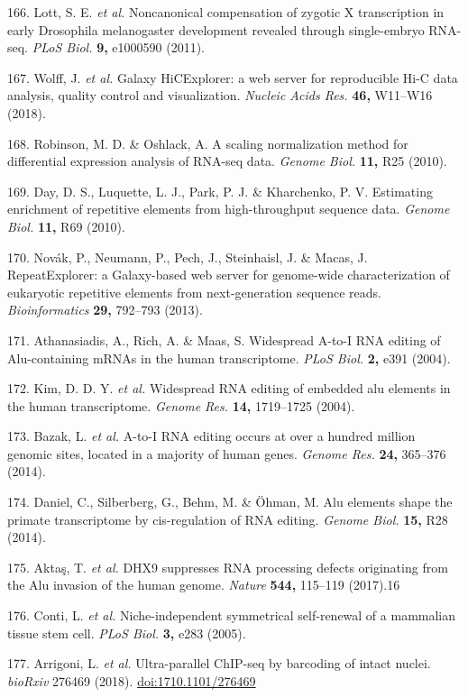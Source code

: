 \documentclass[11pt,twoside]{MPIthesis}
\theoremstyle{definition}
\theoremstyle{definition}
\theoremstyle{definition}
\theoremstyle{remark}
\begin{document}
166. Lott, S. E. \emph{et al.} Noncanonical compensation of zygotic X
transcription in early Drosophila melanogaster development revealed
through single-embryo RNA-seq. \emph{PLoS Biol.} \textbf{9,} e1000590
(2011).

167. Wolff, J. \emph{et al.} Galaxy HiCExplorer: a web server for
reproducible Hi-C data analysis, quality control and visualization.
\emph{Nucleic Acids Res.} \textbf{46,} W11--W16 (2018).

168. Robinson, M. D. \& Oshlack, A. A scaling normalization method for
differential expression analysis of RNA-seq data. \emph{Genome Biol.}
\textbf{11,} R25 (2010).

169. Day, D. S., Luquette, L. J., Park, P. J. \& Kharchenko, P. V.
Estimating enrichment of repetitive elements from high-throughput
sequence data. \emph{Genome Biol.} \textbf{11,} R69 (2010).

170. Novák, P., Neumann, P., Pech, J., Steinhaisl, J. \& Macas, J.
RepeatExplorer: a Galaxy-based web server for genome-wide
characterization of eukaryotic repetitive elements from next-generation
sequence reads. \emph{Bioinformatics} \textbf{29,} 792--793 (2013).

171. Athanasiadis, A., Rich, A. \& Maas, S. Widespread A-to-I RNA
editing of Alu-containing mRNAs in the human transcriptome. \emph{PLoS
Biol.} \textbf{2,} e391 (2004).

172. Kim, D. D. Y. \emph{et al.} Widespread RNA editing of embedded alu
elements in the human transcriptome. \emph{Genome Res.} \textbf{14,}
1719--1725 (2004).

173. Bazak, L. \emph{et al.} A-to-I RNA editing occurs at over a hundred
million genomic sites, located in a majority of human genes.
\emph{Genome Res.} \textbf{24,} 365--376 (2014).

174. Daniel, C., Silberberg, G., Behm, M. \& Öhman, M. Alu elements
shape the primate transcriptome by cis-regulation of RNA editing.
\emph{Genome Biol.} \textbf{15,} R28 (2014).

175. Aktaş, T. \emph{et al.} DHX9 suppresses RNA processing defects
originating from the Alu invasion of the human genome. \emph{Nature}
\textbf{544,} 115--119 (2017).16

176. Conti, L. \emph{et al.} Niche-independent symmetrical self-renewal
of a mammalian tissue stem cell. \emph{PLoS Biol.} \textbf{3,} e283
(2005).

177. Arrigoni, L. \emph{et al.} Ultra-parallel ChIP-seq by barcoding of
intact nuclei. \emph{bioRxiv} 276469 (2018). \url{doi:1710.1101/276469}
\end{document}

